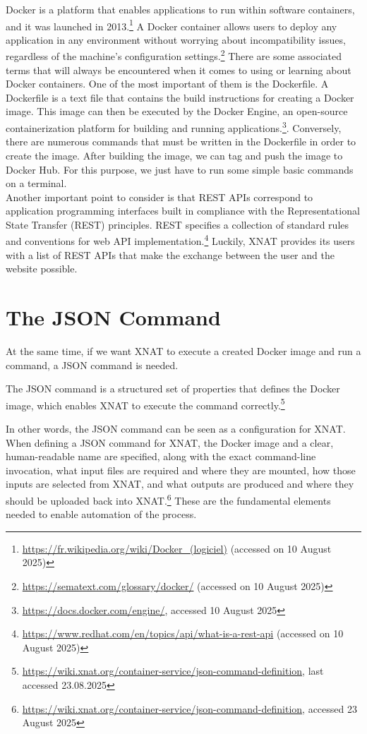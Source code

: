 Docker is a platform that enables applications to run within software containers, and it was launched in 2013.\footnote{\url{https://fr.wikipedia.org/wiki/Docker\_(logiciel)} (accessed on 10 August 2025)} A Docker container allows users to deploy any application in any environment without worrying about incompatibility issues, regardless of the machine’s configuration settings.\footnote{\url{https://sematext.com/glossary/docker/} (accessed on 10 August 2025)} There are some associated terms that will always be encountered when it comes to using or learning about Docker containers.
One of the most important of them is the Dockerfile. A Dockerfile is a text file that contains the build instructions for creating a Docker image. This image can then be executed by the Docker Engine, an open-source containerization platform for building and running applications.\footnote{\url{https://docs.docker.com/engine/}, accessed 10 August 2025}. Conversely, there are numerous commands that must be written in the Dockerfile in order to create the image. After building the image, we can tag and push the image to Docker Hub. For this purpose, we just have to run some simple basic commands on a terminal.
\\
Another important point to consider is that REST APIs correspond to application programming interfaces built in compliance with the Representational State Transfer (REST) principles.
REST specifies a collection of standard rules and conventions for web API implementation.\footnote{\url{https://www.redhat.com/en/topics/api/what-is-a-rest-api} (accessed on 10 August 2025)} Luckily, XNAT provides its users with a list of REST APIs that make the exchange between the user and the website possible. 

\section{The JSON Command}
At the same time, if we want XNAT to execute a created Docker image and run a command, a \ac{JSON} command is needed. 

The JSON command is a structured set of properties that defines the Docker image, which enables XNAT to execute the command correctly.\footnote{\url{https://wiki.xnat.org/container-service/json-command-definition}, last accessed 23.08.2025}

In other words, the JSON command can be seen as a configuration for XNAT. When defining a JSON command for XNAT, the Docker image and a clear, human-readable name are specified, along with the exact command-line invocation, what input files are required and where they are mounted, how those inputs are selected from XNAT, and what outputs are produced and where they should be uploaded back into XNAT.\footnote{\url{https://wiki.xnat.org/container-service/json-command-definition}, accessed 23 August 2025}
These are the fundamental elements needed to enable automation of the process.


